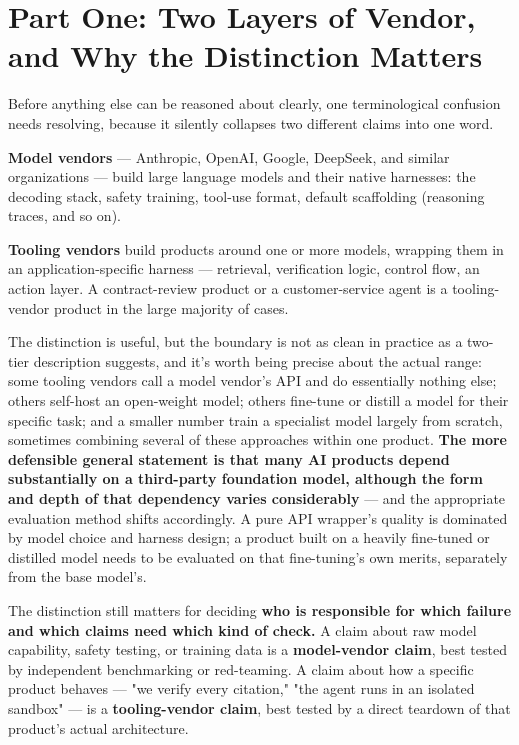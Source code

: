 \section{Part One: Two Layers of Vendor, and Why the Distinction Matters}

Before anything else can be reasoned about clearly, one terminological confusion needs resolving, because it silently collapses two different claims into one word.

\textbf{Model vendors} --- Anthropic, OpenAI, Google, DeepSeek, and similar organizations --- build large language models and their native harnesses: the decoding stack, safety training, tool-use format, default scaffolding (reasoning traces, and so on).

\textbf{Tooling vendors} build products around one or more models, wrapping them in an application-specific harness --- retrieval, verification logic, control flow, an action layer. A contract-review product or a customer-service agent is a tooling-vendor product in the large majority of cases.

The distinction is useful, but the boundary is not as clean in practice as a two-tier description suggests, and it's worth being precise about the actual range: some tooling vendors call a model vendor's API and do essentially nothing else; others self-host an open-weight model; others fine-tune or distill a model for their specific task; and a smaller number train a specialist model largely from scratch, sometimes combining several of these approaches within one product. \textbf{The more defensible general statement is that many AI products depend substantially on a third-party foundation model, although the form and depth of that dependency varies considerably} --- and the appropriate evaluation method shifts accordingly. A pure API wrapper's quality is dominated by model choice and harness design; a product built on a heavily fine-tuned or distilled model needs to be evaluated on that fine-tuning's own merits, separately from the base model's.

The distinction still matters for deciding \textbf{who is responsible for which failure and which claims need which kind of check.} A claim about raw model capability, safety testing, or training data is a \textbf{model-vendor claim}, best tested by independent benchmarking or red-teaming. A claim about how a specific product behaves --- "we verify every citation," "the agent runs in an isolated sandbox" --- is a \textbf{tooling-vendor claim}, best tested by a direct teardown of that product's actual architecture.

